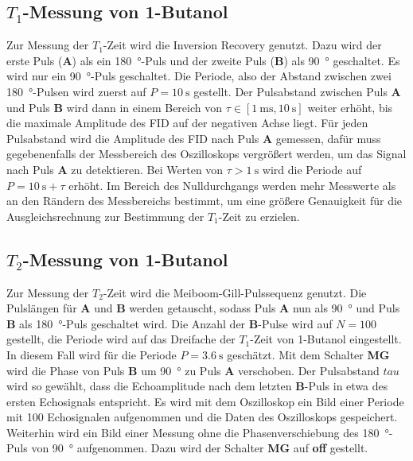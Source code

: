 \subsection{$T_1$-Messung von 1-Butanol}
Zur Messung der $T_1$-Zeit wird die Inversion Recovery genutzt.
Dazu wird der erste Puls (\textbf{A}) als ein \SI{180}{\degree}-Puls und der zweite Puls (\textbf{B}) als \SI{90}{\degree} geschaltet.
Es wird nur ein \SI{90}{\degree}-Puls geschaltet.
Die Periode, also der Abstand zwischen zwei \SI{180}{\degree}-Pulsen wird zuerst auf $P=\SI{10}{\second}$ gestellt.
Der Pulsabstand \tau zwischen Puls \textbf{A} und Puls \textbf{B} wird dann in einem Bereich von $\tau \in [\SI{1}{\milli\second}, \SI{10}{\second}]$ weiter erhöht, bis die maximale Amplitude des FID auf der negativen Achse liegt.
Für jeden Pulsabstand wird die Amplitude des FID nach Puls \textbf{A} gemessen, dafür muss gegebenenfalls der Messbereich des Oszilloskops vergrößert werden, um das Signal nach Puls \textbf{A} zu detektieren.
Bei Werten von $\tau > \SI{1}{\second}$ wird die Periode auf $ P =\SI{10}{\second} + \tau$ erhöht.
Im Bereich des Nulldurchgangs werden mehr Messwerte als an den Rändern des Messbereichs bestimmt, um eine größere Genauigkeit für die Ausgleichsrechnung zur Bestimmung der $T_1$-Zeit zu erzielen.


\subsection{$T_2$-Messung von 1-Butanol}
Zur Messung der $T_2$-Zeit wird die Meiboom-Gill-Pulssequenz genutzt.
Die Pulslängen für \textbf{A} und \textbf{B} werden getauscht, sodass Puls \textbf{A} nun als \SI{90}{\degree} und Puls \textbf{B} als \SI{180}{\degree}-Puls geschaltet wird.
Die Anzahl der \textbf{B}-Pulse wird auf $N=100$ gestellt, die Periode wird auf das Dreifache der $T_1$-Zeit von 1-Butanol eingestellt.
In diesem Fall wird für die Periode $P = \SI{3.6}{\second}$ geschätzt.
Mit dem Schalter \textbf{MG} wird die Phase von Puls \textbf{B} um \SI{90}{\degree} zu Puls \textbf{A} verschoben.
Der Pulsabstand $tau$ wird so gewählt, dass die Echoamplitude nach dem letzten \textbf{B}-Puls in etwa  des ersten Echosignals entspricht.
Es wird mit dem Oszilloskop ein Bild einer Periode mit 100 Echosignalen aufgenommen und die Daten des Oszilloskops gespeichert.
Weiterhin wird ein Bild einer Messung ohne die Phasenverschiebung des \SI{180}{\degree}-Puls von \SI{90}{\degree} aufgenommen. Dazu wird der Schalter \textbf{MG} auf \textbf{off} gestellt.

